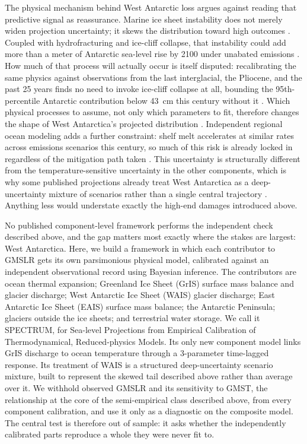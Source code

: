 \documentclass[12pt]{article}
\begin{document}
The physical mechanism behind West Antarctic loss argues against
reading that predictive signal as reassurance. Marine ice sheet
instability does not merely widen projection uncertainty; it skews the
distribution toward high outcomes \citep{Robel2019}. Coupled with
hydrofracturing and ice-cliff collapse, that instability could add more
than a meter of Antarctic sea-level rise by 2100 under unabated
emissions \citep{DeContoP2016}. How much of that process will actually
occur is itself disputed: recalibrating the same physics against
observations from the last interglacial, the Pliocene, and the past 25
years finds no need to invoke ice-cliff collapse at all, bounding the
95th-percentile Antarctic contribution below 43~cm this century without
it \citep{Edwards2019}. Which physical processes to assume, not only
which parameters to fit, therefore changes the shape of West
Antarctica's projected distribution \citep{Kopp2017}. Independent
regional ocean modeling adds a further constraint: shelf melt
accelerates at similar rates across emissions scenarios this century,
so much of this risk is already locked in regardless of the mitigation
path taken \citep{Naughten2023}. This uncertainty is structurally
different from the temperature-sensitive uncertainty in the other
components, which is why some published projections already treat West
Antarctica as a deep-uncertainty mixture of scenarios rather than a
single central trajectory \citep{Bakker2017}. Anything less would
understate exactly the high-end damages introduced above.

No published component-level framework performs the independent check
described above, and the gap matters most exactly where the stakes are
largest: West Antarctica. Here, we build a framework in which each
contributor to GMSLR gets its own parsimonious physical model,
calibrated against an independent observational record using Bayesian
inference. The contributors are ocean thermal expansion; Greenland Ice
Sheet (GrIS) surface mass balance and glacier discharge; West Antarctic
Ice Sheet (WAIS) glacier discharge; East Antarctic Ice Sheet (EAIS)
surface mass balance; the Antarctic Peninsula; glaciers outside the ice
sheets; and terrestrial water storage. We call it SPECTRUM, for
Sea-level Projections from Empirical Calibration of Thermodynamical,
Reduced-physics Models. Its only new component model links GrIS
discharge to ocean temperature through a 3-parameter time-lagged
response. Its treatment of WAIS is a structured deep-uncertainty
scenario mixture, built to represent the skewed tail described above
rather than average over it. We withhold observed GMSLR and its
sensitivity to GMST, the relationship at the core of the semi-empirical
class described above, from every component calibration, and use it
only as a diagnostic on the composite model. The central test is
therefore out of sample: it asks whether the independently calibrated
parts reproduce a whole they were never fit to.



\end{document}
